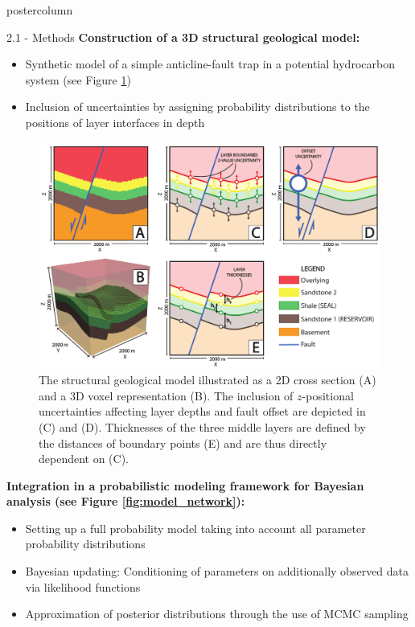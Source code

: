 \documentclass{beamer}
\begin{document}
\begin{frame}
\begin{columns}
\begin{column}{.249\textwidth}
\begin{beamercolorbox}[center]{postercolumn}
\begin{minipage}{.98\textwidth}
{\begin{myblock}{2.1 - Methods}
\textbf{Construction of a 3D structural geological model:}
	\begin{itemize}
	\item Synthetic model of a simple anticline-fault trap in a potential hydrocarbon system (see Figure \ref{fig:unc_lik})
	\item Inclusion of uncertainties by assigning probability distributions to the positions of layer interfaces in depth
	\end{itemize}							
								\vspace{0.5em}
								\begin{figure}
									\begin{minipage}{0.95\textwidth}
										\centering\includegraphics[width=1\textwidth]{figures/Uncertainties_Likelihoods}
										\caption{The structural geological model illustrated as a 2D cross section (A) and a 3D voxel representation (B). The inclusion of $z$-positional uncertainties affecting layer depths and fault offset are depicted in (C) and (D). Thicknesses of the three middle layers are defined by the distances of boundary points (E) and are thus directly dependent on (C).}
										\label{fig:unc_lik}
									\end{minipage}
								\end{figure}
\textbf{Integration in a probabilistic modeling framework for Bayesian analysis (see Figure \ref{fig:model_network}):}
	\begin{itemize}
	\item Setting up a full probability model taking into account all parameter probability distributions
	\item Bayesian updating: Conditioning of parameters on additionally observed data via likelihood functions
	\item Approximation of posterior distributions through the use of MCMC sampling
	\end{itemize}
						

\end{myblock}}
\end{minipage}
\end{beamercolorbox}
\end{column}
\end{columns}
\end{frame}
\end{document}
